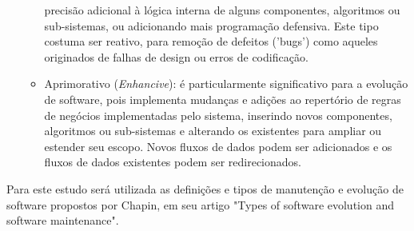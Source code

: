 \begin{itemize}
\begin{itemize}
        precisão adicional à lógica interna de alguns componentes, algoritmos ou sub-sistemas, ou 
        adicionando mais programação defensiva. Este tipo costuma ser reativo, para remoção de defeitos 
        ('bugs') como aqueles originados de falhas de design ou erros de codificação.
        \item Aprimorativo (\textit{Enhancive}): é particularmente significativo para a evolução de software, pois implementa 
        mudanças e adições ao repertório de regras de negócios implementadas pelo sistema, inserindo 
        novos componentes, algoritmos ou sub-sistemas e alterando os existentes para ampliar ou estender 
        seu escopo. Novos fluxos de dados podem ser adicionados e os fluxos de dados existentes podem 
        ser redirecionados.
    \end{itemize}
\end{itemize}

Para este estudo será utilizada as definições e tipos de manutenção e evolução de software 
propostos por Chapin, em seu artigo "Types of software evolution and software maintenance".